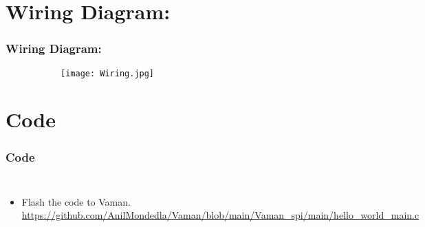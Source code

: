 \documentclass{beamer}
\begin{document}
\section{Wiring Diagram:}
\begin{frame}
\frametitle{Wiring Diagram:}
\begin{figure}[h!]
  \centering
  \begin{subfigure}[b]{0.75\linewidth}
    \texttt{[image: Wiring.jpg]}
  \end{subfigure}
\end{figure}
\end{frame}

\section{Code}
\begin{frame}
\frametitle{Code}
\begin{columns}

  \begin{itemize}
  \item  Flash the code to Vaman.\\
  \url{https://github.com/AnilMondedla/Vaman/blob/main/Vaman_spi/main/hello_world_main.c}
  \end{itemize}
  \  
\end{columns}
\end{frame}
\end{document}
